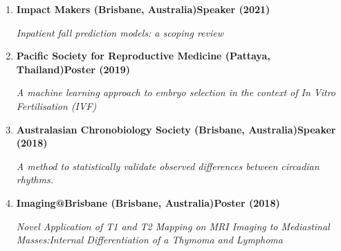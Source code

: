 \begin{enumerate}
		\item
		\textbf{Impact Makers (Brisbane, Australia)}\textbf{\hfill Speaker (2021)}\par 
		\textit{Inpatient fall prediction models: a scoping review}
	\item
		\textbf{Pacific Society for Reproductive Medicine (Pattaya, Thailand)}\textbf{\hfill Poster (2019)}\par 
		\textit{A machine learning approach to embryo selection in the context of In Vitro Fertilisation (IVF)}
	\item
		\textbf{Australasian Chronobiology Society (Brisbane, Australia)}\textbf{\hfill Speaker (2018)}\par 
		\textit{A method to statistically validate observed differences between circadian rhythms.}
	\item
		\textbf{Imaging@Brisbane (Brisbane, Australia)}\textbf{\hfill Poster (2018)}\par 
		\textit{Novel Application of T1 and T2 Mapping on MRI Imaging to Mediastinal Masses:Internal Differentiation of a Thymoma and Lymphoma}
\end{enumerate}\par
